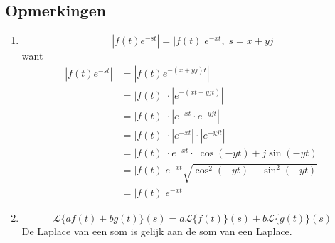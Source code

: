 \documentclass[12pt]{report}
\begin{document}
\subsection{Opmerkingen}
\begin{enumerate}
\item $$|f(t)e^{-st}| = |f(t)|e^{-xt}, \; s = x+yj$$
want
\begin{equation*}
\begin{split}
|f(t)e^{-st}| & = |f(t)e^{-(x + yj)t}| \\
                & = |f(t)|\cdot|e^{-(xt + yjt)}| \\
                & = |f(t)|\cdot|e^{-xt} \cdot e^{-yjt}| \\
                & = |f(t)|\cdot|e^{-xt}|\cdot|e^{-yjt}| \\
                & = |f(t)|\cdot e^{-xt}\cdot|\cos(-yt) + j\sin(-yt)| \\
                & = |f(t)|e^{-xt}\sqrt{\cos^2{(-yt)} + \sin^2{(-yt)}} \\
                & = |f(t)|e^{-xt}
\end{split}
\end{equation*}
\item 
$$\mathcal{L}\{af(t) + bg(t)\}(s) = a\mathcal{L}\{f(t)\}(s) + b\mathcal{L}\{g(t)\}(s)$$
De Laplace van een som is gelijk aan de som van een Laplace.
\end{enumerate}
\end{document}
